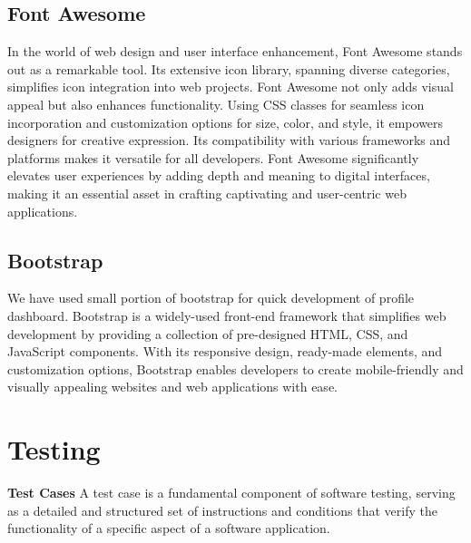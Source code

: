 \subsection{Font Awesome }
In the world of web design and user interface enhancement, Font Awesome stands out as a remarkable tool. Its extensive icon library, spanning diverse categories, simplifies icon integration into web projects. Font Awesome not only adds visual appeal but also enhances functionality. Using CSS classes for seamless icon incorporation and customization options for size, color, and style, it empowers designers for creative expression. Its compatibility with various frameworks and platforms makes it versatile for all developers. Font Awesome significantly elevates user experiences by adding depth and meaning to digital interfaces, making it an essential asset in crafting captivating and user-centric web applications.
\subsection{Bootstrap}
We have used small portion of bootstrap for quick development of profile dashboard. Bootstrap is a widely-used front-end framework that simplifies web development by providing a collection of pre-designed HTML, CSS, and JavaScript components. With its responsive design, ready-made elements, and customization options, Bootstrap enables developers to create mobile-friendly and visually appealing websites and web applications with ease.

\section{Testing}
\textbf{Test Cases}
A test case is a fundamental component of software testing, serving as a detailed and structured set of instructions and conditions that verify the functionality of a specific aspect of a software application.

